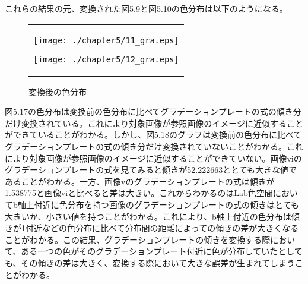 \newpage
これらの結果の元、変換された図5.9と図5.10の色分布は以下のようになる。
\begin{figure}[htbp]
  \begin{center}
    \begin{tabular}{c}

      \begin{minipage}{0.45\hsize}
        \begin{center}
          \texttt{[image: ./chapter5/11\_gra.eps]}
          \caption{変換後の色分布}
          \label{fig:seininhsv}
        \end{center}
      \end{minipage}

      \begin{minipage}{0.45\hsize}
        \begin{center}
          \texttt{[image: ./chapter5/12\_gra.eps]}
          \caption{変換後の色分布}
          \label{fig:kinninhsv}
        \end{center}
      \end{minipage}


    \end{tabular}
  \end{center}
\end{figure}
 
図5.17の色分布は変換前の色分布に比べてグラデーションプレートの式の傾き分だけ変換されている。これにより対象画像が参照画像のイメージに近似することができていることがわかる。しかし、図5.18のグラフは変換前の色分布に比べてグラデーションプレートの式の傾き分だけ変換されていないことがわかる。これにより対象画像が参照画像のイメージに近似することができていない。画像viのグラデーションプレートの式を見てみると傾きが52.222663ととても大きな値であることがわかる。一方、画像vのグラデーションプレートの式は傾きが1.538775と画像viと比べると差は大きい。これからわかるのはLab色空間においてb軸上付近に色分布を持つ画像のグラデーションプレートの式の傾きはとても大きいか、小さい値を持つことがわかる。これにより、b軸上付近の色分布は傾きが1付近などの色分布に比べて分布間の距離によっての傾きの差が大きくなることがわかる。この結果、グラデーションプレートの傾きを変換する際において、ある一つの色がそのグラデーションプレート付近に色が分布していたとしても、その傾きの差は大きく、変換する際において大きな誤差が生まれてしまうことがわかる。\par

